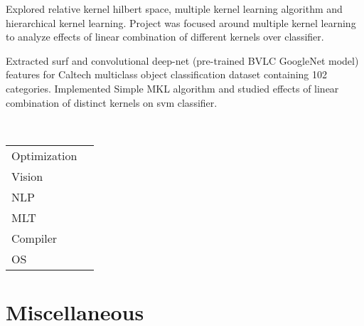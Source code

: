 \documentclass[]{deedy-resume-openfont}
\begin{document}
\begin{minipage}[t]{0.66\textwidth}
\begin{tightemize}
	\item  Explored relative kernel hilbert space, multiple kernel learning algorithm and hierarchical kernel learning. Project was focused around multiple kernel learning to analyze effects of linear combination of different kernels over classifier.
	\item Extracted surf and convolutional deep-net (pre-trained BVLC GoogleNet model) features for Caltech multiclass object classification dataset containing 102 categories. Implemented Simple MKL algorithm and studied effects of linear combination of distinct kernels on svm classifier.
\end{tightemize}
\sectionsep

\\
\vspace{\topsep} 
\begin{tabular}{ll}
	Optimization & \\
	Vision & \\
	NLP & \\
	MLT & \\
	Compiler & \\
	OS & \\ 
\end{tabular}
\sectionsep

\section{Miscellaneous} 

\sectionsep

\end{minipage} 
\end{document}

